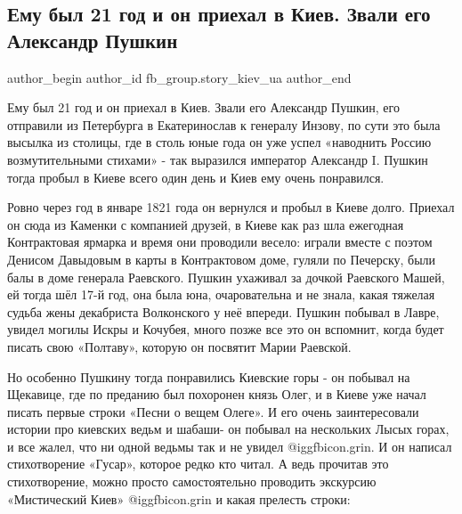  
 
 
 
 
 
\subsection{Ему был 21 год и он приехал в Киев. Звали его Александр Пушкин}
\label{sec:10_02_2022.fb.fb_group.story_kiev_ua.2.pushkin}
 
\ifcmt
 author_begin
   author_id fb_group.story_kiev_ua
 author_end
\fi

Ему был 21 год и он приехал в Киев. Звали его Александр Пушкин, его отправили
из Петербурга в Екатеринослав к генералу Инзову, по сути это была высылка из
столицы, где в столь юные года он уже успел «наводнить Россию возмутительными
стихами» - так выразился император Александр I. Пушкин тогда пробыл в Киеве
всего один день и Киев ему очень понравился.

Ровно через год в январе 1821 года он вернулся и пробыл в Киеве долго. Приехал
он сюда из Каменки с компанией друзей, в Киеве как раз шла ежегодная
Контрактовая ярмарка и время они проводили весело: играли вместе с поэтом
Денисом Давыдовым в карты в Контрактовом доме, гуляли по Печерску, были балы в
доме генерала Раевского. Пушкин ухаживал за дочкой Раевского Машей, ей тогда
шёл 17-й год, она была юна, очаровательна и не знала, какая тяжелая судьба жены
декабриста Волконского у неё впереди. Пушкин побывал в Лавре, увидел могилы
Искры и Кочубея, много позже все это он вспомнит, когда будет писать свою
«Полтаву», которую он посвятит Марии Раевской.

Но особенно Пушкину тогда понравились Киевские горы - он побывал на Щекавице,
где по преданию был похоронен князь Олег, и в Киеве уже начал писать первые
строки «Песни о вещем Олеге». И его очень заинтересовали истории про киевских
ведьм и шабаши- он побывал на нескольких Лысых горах, и все жалел, что ни одной
ведьмы так и не увидел @igg{fbicon.grin}. И он написал стихотворение «Гусар», которое редко кто
читал. А ведь прочитав это стихотворение, можно просто самостоятельно проводить
экскурсию «Мистический Киев» @igg{fbicon.grin}  и какая прелесть строки:

